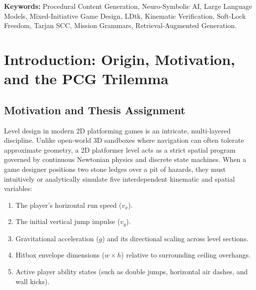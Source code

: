 \documentclass[11pt,a4paper]{report}
\theoremstyle{definition}
\theoremstyle{remark}
\begin{document}
\begin{abstract}
Empirical evaluations across a 35-prompt benchmark suite demonstrate that GLDtk achieves \textbf{100\% verified playability}, \textbf{0\% exported soft-locks}, and \textbf{0.95--1.00 prompt fidelity} on frontier models. For local open-weight 14B models (\texttt{qwen2.5:14b}), deterministic symbolic patching alone boosts verification success from \textbf{0\% (0/6) to 83.3\% (5/6)} on identical recorded outputs. The RAG pattern stamping engine achieves \textbf{100\% (4/4)} verified coverage across all structural terrain types at section heights of 20--40 tiles. In side-by-side human-AI authoring trials, GLDtk accelerates end-to-end multi-section level construction by \textbf{4.89$\times$} compared to manual authoring in LDtk (\textbf{1m 13s vs. 5m 57s}).
\end{abstract}

\vspace{0.5cm}
\noindent \textbf{Keywords:} Procedural Content Generation, Neuro-Symbolic AI, Large Language Models, Mixed-Initiative Game Design, LDtk, Kinematic Verification, Soft-Lock Freedom, Tarjan SCC, Mission Grammars, Retrieval-Augmented Generation.

\tableofcontents
\listoffigures
\listoftables

\chapter{Introduction: Origin, Motivation, and the PCG Trilemma}
\label{chap:intro}

\section{Motivation and Thesis Assignment}
Level design in modern 2D platforming games is an intricate, multi-layered discipline. Unlike open-world 3D sandboxes where navigation can often tolerate approximate geometry, a 2D platformer level acts as a strict spatial program governed by continuous Newtonian physics and discrete state machines. When a game designer positions two stone ledges over a pit of hazards, they must intuitively or analytically simulate five interdependent kinematic and spatial variables:
\begin{enumerate}
    \item The player's horizontal run speed ($v_x$).
    \item The initial vertical jump impulse ($v_y$).
    \item Gravitational acceleration ($g$) and its directional scaling across level sections.
    \item Hitbox envelope dimensions ($w \times h$) relative to surrounding ceiling overhangs.
    \item Active player ability states (such as double jumps, horizontal air dashes, and wall kicks).
\end{enumerate}
\end{document}
